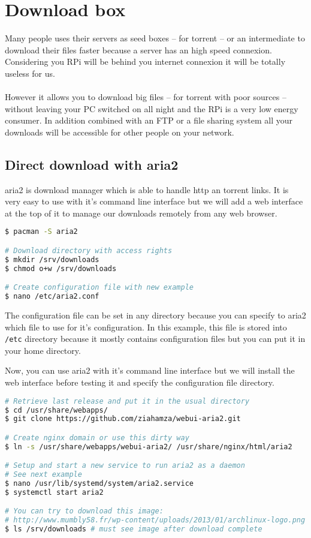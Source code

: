 
\chapter{Download box}
Many people uses their servers as seed boxes -- for torrent -- or an intermediate 
to download their files faster because a server has an high speed connexion. 
Considering you RPi will be behind you internet connexion it will be totally useless 
for us.
\\\\
However it allows you to download big files -- for torrent with poor sources -- 
without leaving your PC switched on all night and the RPi is a very low energy 
consumer. In addition combined with an FTP or a file sharing system all your 
downloads will be accessible for other people on your network.

\section{Direct download with aria2}
aria2 is download manager which is able to handle http an torrent links. It is 
very easy to use with it's command line interface but we will add a web interface 
at the top of it to manage our downloads remotely from any web browser.

\begin{lstlisting}[language=bash,caption=Aria2 setup]
$ pacman -S aria2

# Download directory with access rights
$ mkdir /srv/downloads 
$ chmod o+w /srv/downloads

# Create configuration file with new example
$ nano /etc/aria2.conf
\end{lstlisting}

The configuration file can be set in any directory because you can specify to 
aria2 which file to use for it's configuration. In this example, this file is 
stored into \texttt{/etc} directory because it mostly contains configuration 
files but you can put it in your home directory.

\lstset{language=bash,caption=Aria2 configuration file}


Now, you can use aria2 with it's command line interface but we will install the 
web interface before testing it and specify the configuration file directory.

\begin{lstlisting}[language=bash,caption=Install aria2 interface]
# Retrieve last release and put it in the usual directory
$ cd /usr/share/webapps/
$ git clone https://github.com/ziahamza/webui-aria2.git

# Create nginx domain or use this dirty way
$ ln -s /usr/share/webapps/webui-aria2/ /usr/share/nginx/html/aria2

# Setup and start a new service to run aria2 as a daemon
# See next example 
$ nano /usr/lib/systemd/system/aria2.service
$ systemctl start aria2

# You can try to download this image: 
# http://www.mumbly58.fr/wp-content/uploads/2013/01/archlinux-logo.png
$ ls /srv/downloads # must see image after download complete
\end{lstlisting}

